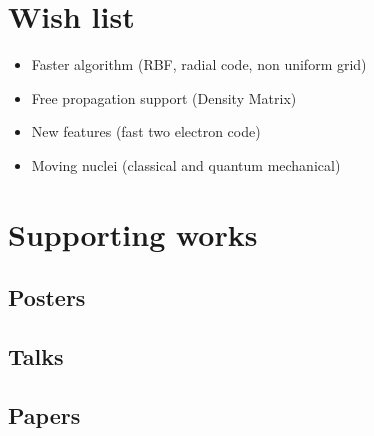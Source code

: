\documentclass{article}
\begin{document}
\section{Wish list} %
\label{sec:wish_list}
\begin{itemize}
    \item Faster algorithm (RBF, radial code, non uniform grid)
    \item Free propagation support (Density Matrix)
    \item New features (fast two electron code)
    \item Moving nuclei (classical and quantum mechanical)
\end{itemize}

\section{Supporting works} %
\label{sec:supporting_works}
\subsection{Posters} %
\label{sub:posters}

\subsection{Talks} %
\label{sub:talks}

\subsection{Papers} %
\label{sub:papers}

\end{document}
